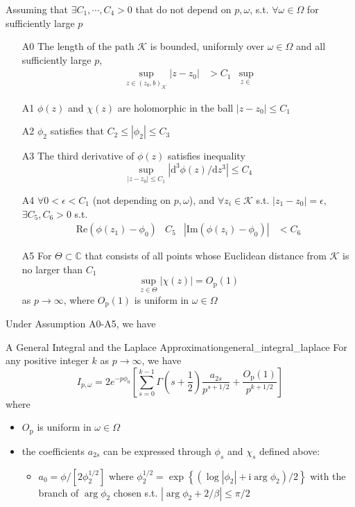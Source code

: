 \documentclass[twoside]{article}
\begin{document}
Assuming that $\exists C_1,\cdots,C_4>0$ that do not depend on $p,\omega$, s.t. $\forall \omega\in\Omega$ for sufficiently large $p$ 
\begin{itemize}
    \item[A0] The length of the path $\mathcal{K}$ is bounded, uniformly over $\omega \in \Omega$ and all sufficiently large $p$,
    \begin{align*}
        \sup_{z\in(z_0,b)_{\mathcal{K}}} \left\vert z-z_0 \right\vert &> C_1 & \sup_{z\in}
    \end{align*}
    \item[A1] $\phi(z)$ and $\chi(z)$ are holomorphic in the ball $\left\vert z-z_0 \right\vert \leq C_1$
    \item[A2] $\phi_2$ satisfies that $C_2\leq \left\vert \phi_2 \right\vert \leq C_3$ 
    \item[A3] The third derivative of $\phi(z)$ satisfies inequality $$ \sup_{\left\vert z-z_0 \right\vert \leq C_1} \left\vert \mathrm{d}^3\phi(z)/\mathrm{d}z^3 \right\vert \leq C_4 $$
    \item[A4] $\forall 0<\epsilon<C_1$ (not depending on $p,\omega$), and $\forall z_i\in \mathcal{K}$ s.t. $\left\vert z_1-z_0 \right\vert = \epsilon$, $\exists C_5,C_6>0$ s.t.
    \begin{align*}
        \mathrm{Re}\left(\phi(z_1)-\phi_0\right) &C_5 & \left\vert \mathrm{Im}\left(\phi(z_i)-\phi_0\right) \right\vert& < C_6
    \end{align*}
    \item[A5] For $\Theta\subset \mathbb{C}$ that consists of all points whose Euclidean distance from $\mathcal{K}$ is no larger than $C_1$
    $$ \sup_{z\in\Theta} \left\vert \chi(z) \right\vert = O_{\mathrm{p}}(1) $$
    as $p\rightarrow \infty$, where $O_{\mathrm{p}}(1)$ is uniform in $\omega\in \Omega$ 
\end{itemize}
Under Assumption A0-A5, we have
\begin{lemma}{A General Integral and the Laplace Approximation}{general_integral_laplace}
    For any positive integer $k$ as $p\rightarrow \infty$, we have 
    $$
    I_{p,\omega} = 2e^{-p\phi_0} \left[ \sum^{k-1}_{s=0}\Gamma \left( s + \frac{1}{2} \right) \frac{a_{2s}}{p^{s+1/2}} + \frac{O_{\mathrm{p}}(1)}{p^{k+1/2}} \right]
    $$
    where
    \begin{itemize}
        \item $O_{\mathrm{p}}$ is  uniform in $\omega \in \Omega$
        \item the coefficients $a_{2s}$ can be expressed through $\phi_s$ and $\chi_s$ defined above:
        \begin{itemize}
            \item $a_0 = \phi/[2\phi_2^{1/2}]$ where $\phi_2^{1/2}=\exp\left\{ (\log\left\vert \phi_2 \right\vert + \mathrm{i}\arg \phi_2)/2 \right\}$ with the branch of $\arg \phi_2$ chosen s.t. $\left\vert \arg \phi_2 + 2/\beta \right\vert \leq \pi/2$
        \end{itemize}
    \end{itemize}
\end{lemma}
\end{document}
